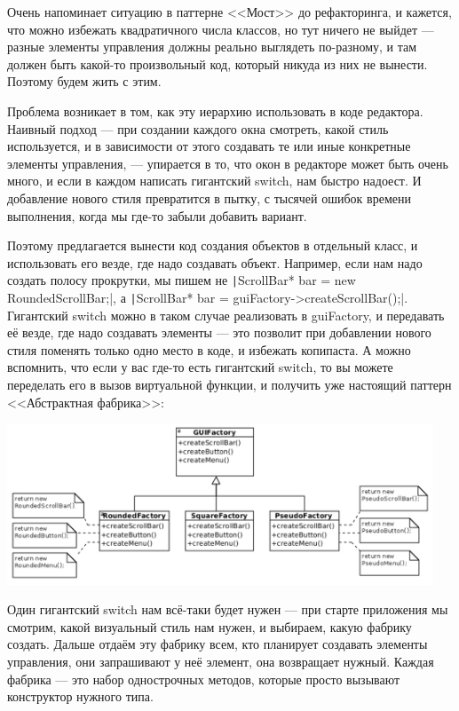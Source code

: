 \documentclass{../../text-style}
\begin{document}
Очень напоминает ситуацию в паттерне <<Мост>> до рефакторинга, и кажется, что можно избежать квадратичного числа классов, но тут ничего не выйдет --- разные элементы управления должны реально выглядеть по-разному, и там должен быть какой-то произвольный код, который никуда из них не вынести. Поэтому будем жить с этим.

Проблема возникает в том, как эту иерархию использовать в коде редактора. Наивный подход --- при создании каждого окна смотреть, какой стиль используется, и в зависимости от этого создавать те или иные конкретные элементы управления, --- упирается в то, что окон в редакторе может быть очень много, и если в каждом написать гигантский switch, нам быстро надоест. И добавление нового стиля превратится в пытку, с тысячей ошибок времени выполнения, когда мы где-то забыли добавить вариант.

Поэтому предлагается вынести код создания объектов в отдельный класс, и использовать его везде, где надо создавать объект. Например, если нам надо создать полосу прокрутки, мы пишем не \texttt|ScrollBar* bar = new RoundedScrollBar;|, а \texttt|ScrollBar* bar = guiFactory->createScrollBar();|. Гигантский switch можно в таком случае реализовать в guiFactory, и передавать её везде, где надо создавать элементы --- это позволит при добавлении нового стиля поменять только одно место в коде, и избежать копипаста. А можно вспомнить, что если у вас где-то есть гигантский switch, то вы можете переделать его в вызов виртуальной функции, и получить уже настоящий паттерн <<Абстрактная фабрика>>:

\begin{center}
    \includegraphics[width=0.95\textwidth]{widgetFactory.png}
\end{center}

Один гигантский switch нам всё-таки будет нужен --- при старте приложения мы смотрим, какой визуальный стиль нам нужен, и выбираем, какую фабрику создать. Дальше отдаём эту фабрику всем, кто планирует создавать элементы управления, они запрашивают у неё элемент, она возвращает нужный. Каждая фабрика --- это набор однострочных методов, которые просто вызывают конструктор нужного типа.
\end{document}
